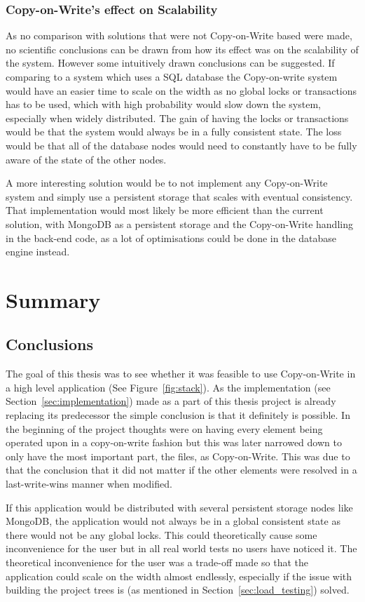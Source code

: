 \documentclass[a4paper,12pt]{article}
\begin{document}
\subsubsection{Copy-on-Write's effect on Scalability}
As no comparison with solutions that were not Copy-on-Write based were made, no scientific
conclusions can be drawn from how its effect was on the scalability of the system. However some
intuitively drawn conclusions can be suggested. If comparing to a system which uses a SQL database
the Copy-on-write system would have an easier time to scale on the width as no global locks or 
transactions has to be used, which with high probability would slow down the system, especially 
when widely distributed. 
The gain of having the locks or transactions would be that the system would always be
in a fully consistent state. The loss would be that all of the database nodes would need to 
constantly have to be fully aware of the state of the other nodes. 

\par A more interesting solution would be to not implement any Copy-on-Write system and simply use 
a persistent storage that scales with eventual consistency. That implementation would most likely be
more efficient than the current solution, with MongoDB as a persistent storage and the Copy-on-Write
handling in the back-end code, as a lot of optimisations could be done in the database engine
instead.

\newpage
\section{Summary}
\subsection{Conclusions}
The goal of this thesis was to see whether it was feasible to use Copy-on-Write in a high level
application (See Figure~\ref{fig:stack}). As the implementation (see
Section~\ref{sec:implementation}) made as a part of this thesis project is already replacing its
predecessor the simple conclusion is that it definitely is possible. In the beginning of the project
thoughts were on having every element being operated upon in a copy-on-write fashion but this was
later narrowed down to only have the most important part, the files, as Copy-on-Write. This was due
to that the conclusion that it did not matter if the other elements were resolved in a
last-write-wins manner when modified.

\par If this application would be distributed with several persistent storage nodes like MongoDB,
the application would not always be in a global consistent state as there would not be any global
locks.  This could theoretically cause some inconvenience for the user but in all real world tests
no users have noticed it. The theoretical inconvenience for the user was a trade-off made so that
the application could scale on the width almost endlessly, especially if the issue with building the
project trees is (as mentioned in Section~\ref{sec:load_testing}) solved.
\end{document}
